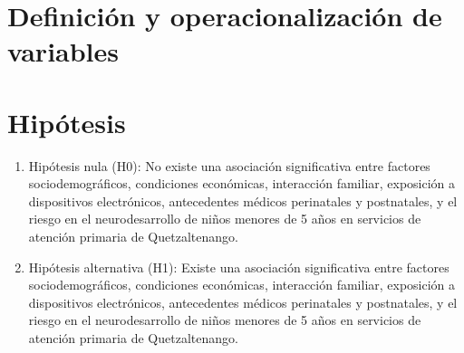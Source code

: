 \documentclass[11pt,letterpaper]{report}
\begin{document}
\section{Definición y operacionalización de variables}


\section{Hipótesis}
	\begin{enumerate}
		\item Hipótesis nula (H0): No existe una asociación significativa entre
		factores sociodemográficos, condiciones económicas, interacción
		familiar, exposición a dispositivos electrónicos, antecedentes médicos
		perinatales y postnatales, y el riesgo en el neurodesarrollo de niños
		menores de 5 años en servicios de atención primaria de Quetzaltenango.
		\item Hipótesis alternativa (H1): Existe una asociación significativa
		entre factores sociodemográficos, condiciones económicas, interacción
		familiar, exposición a dispositivos electrónicos, antecedentes médicos
		perinatales y postnatales, y el riesgo en el neurodesarrollo de niños
		menores de 5 años en servicios de atención primaria de Quetzaltenango.
	\end{enumerate}
\end{document}
